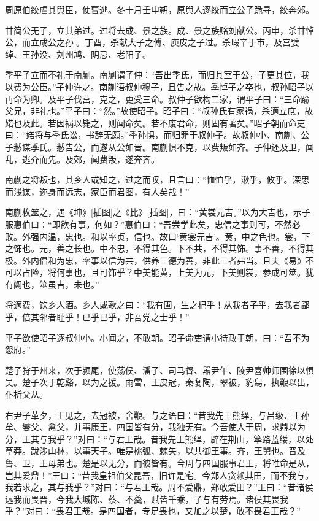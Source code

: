 \documentclass[a4paper,12pt,UTF8,twoside]{ctexbook}
\begin{document}
周原伯绞虐其舆臣，使曹逃。冬十月壬申朔，原舆人逐绞而立公子跪寻，绞奔郊。

甘简公无子，立其弟过。过将去成、景之族。成、景之族赂刘献公。丙申，杀甘悼公，而立成公之孙。丁酉，杀献大子之傅、庾皮之子过。杀瑕辛于市，及宫嬖绰、王孙没、刘州鸠、阴忌、老阳子。

季平子立而不礼于南蒯。南蒯谓子仲：“吾出季氏，而归其室于公，子更其位，我以费为公臣。”子仲许之。南蒯语叔仲穆子，且告之故。季悼子之卒也，叔孙昭子以再命为卿。及平子伐莒，克之，更受三命。叔仲子欲构二家，谓平子曰：“三命踰父兄，非礼也。”平子曰：“然。”故使昭子。昭子曰：“叔孙氏有家祸，杀適立庶，故婼也及此。若因祸以毙之，则闻命矣。若不废君命，则固有著矣。”昭子朝而命吏曰：“婼将与季氏讼，书辞无颇。”季孙惧，而归罪于叔仲子。故叔仲小、南蒯、公子慭谋季氏。慭告公，而遂从公如晋。南蒯惧不克，以费叛如齐。子仲还及卫，闻乱，逃介而先。及郊，闻费叛，遂奔齐。

南蒯之将叛也，其乡人或知之，过之而叹，且言曰：“恤恤乎，湫乎，攸乎。深思而浅谋，迩身而远志，家臣而君图，有人矣哉！”

南蒯枚筮之，遇《坤》[插图]之《比》[插图]，曰：“黄裳元吉。”以为大吉也，示子服惠伯曰：“即欲有事，何如？”惠伯曰：“吾尝学此矣，忠信之事则可，不然必败。外强内温，忠也。和以率贞，信也。故曰‘黄裳元吉’。黄，中之色也。裳，下之饰也。元，善之长也。中不忠，不得其色。下不共，不得其饰。事不善，不得其极。外内倡和为忠，率事以信为共，供养三德为善，非此三者弗当。且夫《易》不可以占险，将何事也，且可饰乎？中美能黄，上美为元，下美则裳，参成可筮。犹有阙也，筮虽吉，未也。”

将適费，饮乡人酒。乡人或歌之曰：“我有圃，生之杞乎！从我者子乎，去我者鄙乎，倍其邻者耻乎！已乎已乎，非吾党之士乎！”

平子欲使昭子逐叔仲小。小闻之，不敢朝。昭子命吏谓小待政于朝，曰：“吾不为怨府。”

楚子狩于州来，次于颍尾，使荡侯、潘子、司马督、嚣尹午、陵尹喜帅师围徐以惧吴。楚子次于乾谿，以为之援。雨雪，王皮冠，秦复陶，翠被，豹舄，执鞭以出，仆析父从。

右尹子革夕，王见之，去冠被，舍鞭。与之语曰：“昔我先王熊绎，与吕级、王孙牟、燮父、禽父，并事康王，四国皆有分，我独无有。今吾使人于周，求鼎以为分，王其与我乎？”对曰：“与君王哉。昔我先王熊绎，辟在荆山，筚路蓝缕，以处草莽。跋涉山林，以事天子。唯是桃弧、棘矢，以共御王事。齐，王舅也。晋及鲁、卫，王母弟也。楚是以无分，而彼皆有。今周与四国服事君王，将唯命是从，岂其爱鼎！”王曰：“昔我皇祖伯父昆吾，旧许是宅。今郑人贪赖其田，而不我与。我若求之，其与我乎？”对曰：“与君王哉。周不爱鼎，郑敢爱田？”王曰：“昔诸侯远我而畏晋，今我大城陈、蔡、不羹，赋皆千乘，子与有劳焉。诸侯其畏我乎？”对曰：“畏君王哉。是四国者，专足畏也，又加之以楚，敢不畏君王哉？”
\end{document}
